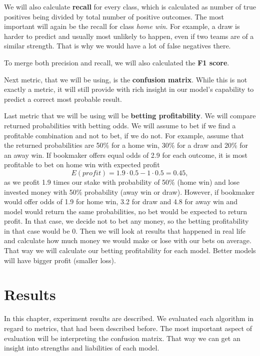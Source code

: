 \documentclass[conference]{IEEEtran}
\begin{document}
We will also calculate \textbf{recall} for every class, which is calculated as number of true
positives being divided by total number of positive outcomes. The most important will again be the
recall for class \textit{home win}. For example, a draw is harder to predict and usually most unlikely to happen, 
even if two teams are of a similar strength. That is why we would have a lot of false negatives there.

To merge both precision and recall, we will also calculated the \textbf{F1 score}.

Next metric, that we will be using, is the \textbf{confusion matrix}. While this is not
exactly a metric, it will still provide with rich insight in our model's capability 
to predict a correct most probable result.

Last metric that we will be using will be \textbf{betting profitability}. We will 
compare returned probabilities with betting odds. We will assume to bet if we find a 
profitable combination and not to bet, if we do not. For example, assume that the returned 
probabilities are 50\% for a home win, 30\% for a draw and 20\% for an away win. If bookmaker 
offers equal odds of 2.9 for each outcome, it is most profitable to bet on home win with 
expected profit $$E(profit) = 1.9 \cdot 0.5 - 1 \cdot 0.5 = 0.45, $$
as we profit 1.9 times our stake with probability of 50\% (home win) and lose invested money
with 50\% probability (away win or draw). However, if bookmaker would offer odds of 1.9 for
home win, 3.2 for draw and 4.8 for away win and model would return the same probabilities, no
bet would be expected to return profit. In that case, we decide not to bet any money, so the
betting profitability in that case would be 0. Then we will look at results that happened 
in real life and calculate how much money we would make or lose with our bets on average. That way 
we will calculate our betting profitability for each model. Better models will have bigger profit 
(smaller loss).

\section{Results}

In this chapter, experiment results are described. We evaluated each algorithm
in regard to metrics, that had been described before. The most important aspect of evaluation
will be interpreting the confusion matrix. That way we can get an insight into strengths 
and liabilities of each model.
\end{document}
